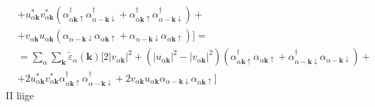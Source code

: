 \documentclass[class=article, crop=false]{standalone}
\begin{document}
\begin{equation}
\begin{split}
		& +	u_{ \alpha \mathbf{k}}^{ \ast} v_{ \alpha \mathbf{k}}^{ \ast} ( \alpha_{ \alpha \mathbf{k} \uparrow}^{ \dagger} \alpha_{ \alpha - \mathbf{k} \downarrow}^{ \dagger} + \alpha_{ \alpha \mathbf{k} \uparrow}^{ \dagger} \alpha_{ \alpha - \mathbf{k} \downarrow}^{ \dagger} ) + \\
		& + v_{ \alpha \mathbf{k}} u_{ \alpha \mathbf{k}} ( \alpha_{ \alpha - \mathbf{k} \downarrow} \alpha_{ \alpha \mathbf{k} \uparrow} + \alpha_{ \alpha - \mathbf{k} \downarrow} \alpha_{ \alpha \mathbf{k} \uparrow} ) ] = \\
		& = \sum_{ \alpha} \sum_{ \mathbf{k}} \tilde{ \varepsilon}_{ \alpha} ( \mathbf{k}) 
		[ 2 \left| v_{ \alpha \mathbf{k}} \right|^{2} + ( \left| u_{ \alpha \mathbf{k}} \right|^{2} - \left| v_{ \alpha \mathbf{k}} \right|^{2} ) \left( \alpha_{ \alpha \mathbf{k} \uparrow}^{ \dagger} \alpha_{ \alpha \mathbf{k} \uparrow} + \alpha_{ \alpha - \mathbf{k} \downarrow}^{ \dagger} \alpha_{ \alpha - \mathbf{k} \downarrow} \right) + \\
		& +	2 u_{ \alpha \mathbf{k}}^{ \ast} v_{ \alpha \mathbf{k}}^{ \ast} \alpha_{ \alpha \mathbf{k} \uparrow}^{ \dagger} \alpha_{ \alpha - \mathbf{k} \downarrow}^{ \dagger} + 2 v_{ \alpha \mathbf{k}} u_{ \alpha \mathbf{k}} \alpha_{ \alpha - \mathbf{k} \downarrow} \alpha_{ \alpha \mathbf{k} \uparrow} ]
	\end{split}
\end{equation}
II liige
\end{document}
